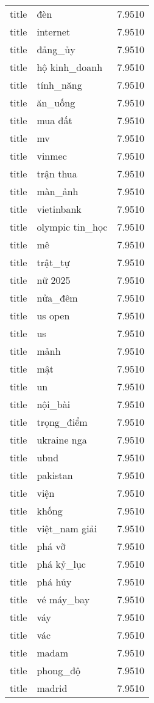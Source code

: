 \documentclass{article}
\begin{document}
\begin{tabular}{lll}
title & đèn & 7.9510\\
title & internet & 7.9510\\
title & đảng\_ủy & 7.9510\\
title & hộ kinh\_doanh & 7.9510\\
title & tính\_năng & 7.9510\\
title & ăn\_uống & 7.9510\\
title & mua đất & 7.9510\\
title & mv & 7.9510\\
title & vinmec & 7.9510\\
title & trận thua & 7.9510\\
title & màn\_ảnh & 7.9510\\
title & vietinbank & 7.9510\\
title & olympic tin\_học & 7.9510\\
title & mê & 7.9510\\
title & trật\_tự & 7.9510\\
title & nữ 2025 & 7.9510\\
title & nửa\_đêm & 7.9510\\
title & us open & 7.9510\\
title & us & 7.9510\\
title & mảnh & 7.9510\\
title & mật & 7.9510\\
title & un & 7.9510\\
title & nội\_bài & 7.9510\\
title & trọng\_điểm & 7.9510\\
title & ukraine nga & 7.9510\\
title & ubnd & 7.9510\\
title & pakistan & 7.9510\\
title & viện & 7.9510\\
title & khống & 7.9510\\
title & việt\_nam giải & 7.9510\\
title & phá vỡ & 7.9510\\
title & phá kỷ\_lục & 7.9510\\
title & phá hủy & 7.9510\\
title & vé máy\_bay & 7.9510\\
title & váy & 7.9510\\
title & vác & 7.9510\\
title & madam & 7.9510\\
title & phong\_độ & 7.9510\\
title & madrid & 7.9510\\

\end{tabular}
\end{document}
